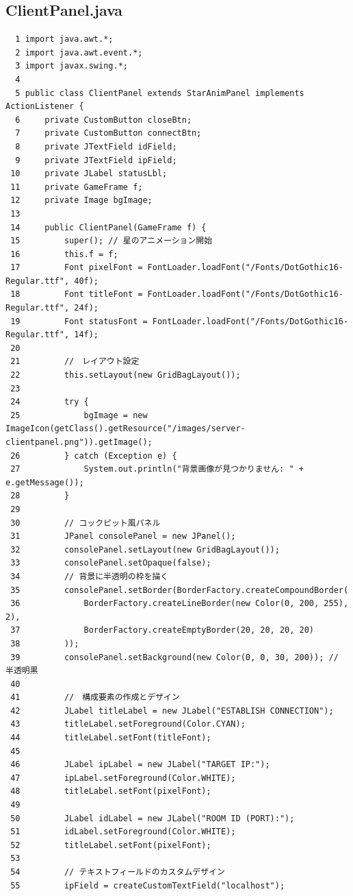 \documentclass[11pt,a4j]{jarticle}
\begin{document}
\subsection*{ClientPanel.java}
\begin{small}
\begin{verbatim}
  1 import java.awt.*;
  2 import java.awt.event.*;
  3 import javax.swing.*;
  4 
  5 public class ClientPanel extends StarAnimPanel implements ActionListener {
  6     private CustomButton closeBtn;
  7     private CustomButton connectBtn;
  8     private JTextField idField;
  9     private JTextField ipField;
 10     private JLabel statusLbl;
 11     private GameFrame f;
 12     private Image bgImage;
 13 
 14     public ClientPanel(GameFrame f) {
 15         super(); // 星のアニメーション開始
 16         this.f = f;
 17         Font pixelFont = FontLoader.loadFont("/Fonts/DotGothic16-Regular.ttf", 40f);
 18         Font titleFont = FontLoader.loadFont("/Fonts/DotGothic16-Regular.ttf", 24f);
 19         Font statusFont = FontLoader.loadFont("/Fonts/DotGothic16-Regular.ttf", 14f);
 20         
 21         //　レイアウト設定
 22         this.setLayout(new GridBagLayout());
 23 
 24         try {
 25             bgImage = new ImageIcon(getClass().getResource("/images/server-clientpanel.png")).getImage();
 26         } catch (Exception e) {
 27             System.out.println("背景画像が見つかりません: " + e.getMessage());
 28         }
 29 
 30         // コックピット風パネル
 31         JPanel consolePanel = new JPanel();
 32         consolePanel.setLayout(new GridBagLayout());
 33         consolePanel.setOpaque(false);
 34         // 背景に半透明の枠を描く
 35         consolePanel.setBorder(BorderFactory.createCompoundBorder(
 36             BorderFactory.createLineBorder(new Color(0, 200, 255), 2),
 37             BorderFactory.createEmptyBorder(20, 20, 20, 20)
 38         ));
 39         consolePanel.setBackground(new Color(0, 0, 30, 200)); // 半透明黒
 40 
 41         //　構成要素の作成とデザイン
 42         JLabel titleLabel = new JLabel("ESTABLISH CONNECTION");
 43         titleLabel.setForeground(Color.CYAN);
 44         titleLabel.setFont(titleFont);
 45 
 46         JLabel ipLabel = new JLabel("TARGET IP:");
 47         ipLabel.setForeground(Color.WHITE);
 48         titleLabel.setFont(pixelFont);
 49         
 50         JLabel idLabel = new JLabel("ROOM ID (PORT):");
 51         idLabel.setForeground(Color.WHITE);
 52         titleLabel.setFont(pixelFont);
 53 
 54         // テキストフィールドのカスタムデザイン
 55         ipField = createCustomTextField("localhost");

\end{verbatim}
\end{small}
\end{document}
